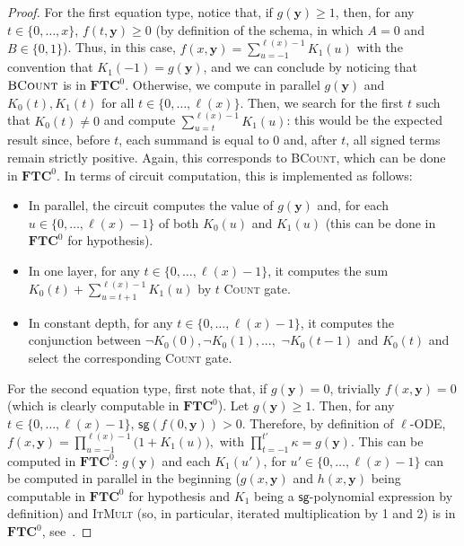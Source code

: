\documentclass[11pt, oneside]{article}
\newcommand{\fun}[1]{\mathsf{#1}}
\newcommand{\TC}{\mathbf{FTC}}
\newcommand{\tu}[1]{\mathbf{#1}}
\theoremstyle{definition}
\begin{document}
\begin{proof}
For the first equation type, notice that, if $g(\tu y)\ge 1$, then, for any $t\in \{0,\dots, x\}$, $f(t, \tu y)\ge 0$ (by definition of the schema, in which $A=0$ and $B\in\{0,1\}$).
Thus, in this case,
$
f(x, \tu y) = \sum^{\ell(x)-1}_{u=-1} K_1(u)
$
with the convention that $K_1(-1)=g(\tu y)$, and we can conclude by noticing that $\textsc{BCount}$ is in $\TC^0$.
%
Otherwise, we compute in parallel $g(\tu y)$ and $K_0(t), K_1(t)$ for all $t\in \{0, \dots, \ell(x)\}$.
%
Then, we search for the first $t$ such that $K_0(t)\neq 0$ and compute $\sum^{\ell(x)-1}_{u=t} K_1(u)$:
this would be the expected result since, before $t$, each summand is equal to 0 and, after $t$, all signed terms remain strictly positive.
%
Again, this corresponds to \textsc{BCount}, which can be done in $\TC^0$.
In terms of circuit computation, this is implemented as follows:
\begin{itemize}
    \itemsep0em
    \item In parallel, the circuit computes the value of $g(\tu y)$ and, for each $u\in \{0, \dots, \ell(x)-1\}$ of both $K_0(u)$ and $K_1(u)$ (this can be done in $\TC^0$ for hypothesis).
    \item In one layer, for any $t\in \{0, \dots, \ell(x)-1\}$, it computes the sum $K_0(t) + \sum^{\ell(x)-1}_{u=t+1}K_1(u)$ by $t$ \textsc{Count} gate.
    \item In constant depth, for any $t\in \{0, \dots, \ell(x)-1\}$, it computes the conjunction between  $\neg K_0(0), \neg K_0(1), ..., $ $\neg K_0(t-1)$ and $K_0(t)$ and select the corresponding \textsc{Count} gate.
\end{itemize}

For the second equation type, first note that, if $g(\tu y)=0$, trivially $f(x, \tu y)=0$ (which is clearly computable in $\TC^0$). Let $g(\tu y)\ge 1$. 
%
Then, for any $t\in \{0, \dots, \ell(x)-1\}$, $\fun{sg}(f(0, \tu y))>0$.
    Therefore, by definition of $\ell$-ODE,   
    $
        f(x, \tu y) = \prod^{\ell(x)-1}_{u=-1} \big(1+ K_1(u)\big),
    $
    with $\prod^{t'}_{t=-1} \kappa=g(\tu y)$.
    This can be computed in $\TC^0$: $g(\tu y)$ and each $K_1(u')$, for $u'\in \{0,\dots, \ell(x)-1\}$ can be computed in parallel in the beginning ($g(x, \tu y)$ and $h(x, \tu y)$ being computable in $\TC^0$ for hypothesis and $K_1$ being a $\fun{sg}$-polynomial expression by definition) and \textsc{ItMult} (so, in particular, iterated multiplication by 1 and 2) is in $\TC^0$, see~\cite{HAB}.
\end{proof}
\end{document}

